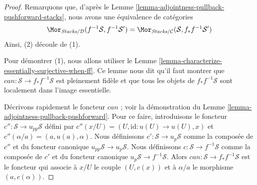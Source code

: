 \begin{proof}
Remarquons que, d'après le
Lemme \ref{lemma-adjointness-pullback-pushforward-stacks},
nous avons une équivalence de catégories
$$
\Mor_{\textit{Stacks}/\mathcal{D}}(f^{-1}\mathcal{S}, f^{-1}\mathcal{S}')
=
\Mor_{\textit{Stacks}/\mathcal{C}}(\mathcal{S}, f_*f^{-1}\mathcal{S}')
$$
Ainsi, (2) découle de (1).

\medskip\noindent
Pour démontrer (1), nous allons utiliser le
Lemme \ref{lemma-characterize-essentially-surjective-when-ff}.
Ce lemme nous dit qu'il faut montrer que
$can : \mathcal{S} \to f_*f^{-1}\mathcal{S}$ est
pleinement fidèle et que tous les objets de $f_*f^{-1}\mathcal{S}$
sont localement dans l'image essentielle.

\medskip\noindent
Décrivons rapidement le foncteur $can$ ; voir la démonstration du
Lemme \ref{lemma-adjointness-pullback-pushforward}.
Pour ce faire, introduisons le foncteur
$c'' : \mathcal{S} \to u_{pp}\mathcal{S}$ défini par
$c''(x/U) = (U, \text{id} : u(U) \to u(U), x)$ et
$c''(\alpha/a) = (a, u(a), \alpha)$. Nous définissons
$c' : \mathcal{S} \to u_p\mathcal{S}$ comme la composée
de $c''$ et du foncteur canonique $u_{pp}\mathcal{S} \to u_p\mathcal{S}$.
Nous définissons $c : \mathcal{S} \to f^{-1}\mathcal{S}$ comme la composée
de $c'$ et du foncteur canonique $u_p\mathcal{S} \to f^{-1}\mathcal{S}$.
Alors $can : \mathcal{S} \to f_*f^{-1}\mathcal{S}$ est le foncteur
qui associe à $x/U$ le couple $(U, c(x))$ et à
$\alpha/a$ le morphisme $(a, c(\alpha))$.


\end{proof}

